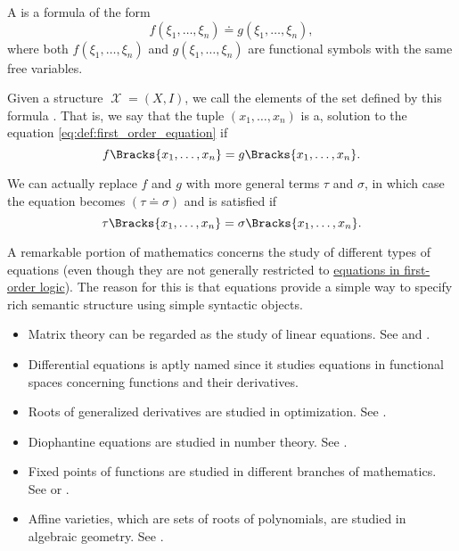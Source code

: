 \begin{definition}\label{def:first_order_equation}
  A  is a formula of the form
  \begin{equation}\label{eq:def:first_order_equation}
    f(\xi_1, \ldots, \xi_n) \doteq g(\xi_1, \ldots, \xi_n),
  \end{equation}
  where both \( f(\xi_1, \ldots, \xi_n) \) and \( g(\xi_1, \ldots, \xi_n) \) are functional symbols with the same free variables.

  Given a structure \( \mscrX = (X, I) \), we call the elements of the set defined by this formula . That is, we say that the tuple \( (x_1, \ldots, x_n) \) is a, solution to the equation \eqref{eq:def:first_order_equation} if
  \begin{equation*}
    f\Bracks{x_1, \ldots, x_n} = g\Bracks{x_1, \ldots, x_n}.
  \end{equation*}

  We can actually replace \( f \) and \( g \) with more general terms \( \tau \) and \( \sigma \), in which case the equation becomes \( (\tau \doteq \sigma) \) and is satisfied if
  \begin{equation*}
    \tau\Bracks{x_1, \ldots, x_n} = \sigma\Bracks{x_1, \ldots, x_n}.
  \end{equation*}
\end{definition}

\begin{example}\label{ex:equations}
  A remarkable portion of mathematics concerns the study of different types of equations (even though they are not generally restricted to \hyperref[def:first_order_equation]{equations in first-order logic}). The reason for this is that equations provide a simple way to specify rich semantic structure using simple syntactic objects.

  \begin{itemize}
    \item Matrix theory can be regarded as the study of linear equations. See  and .
    \item Differential equations is aptly named since it studies equations in functional spaces concerning functions and their derivatives.
    \item Roots of generalized derivatives are studied in optimization. See .
    \item Diophantine equations are studied in number theory. See .
    \item Fixed points of functions are studied in different branches of mathematics. See  or .
    \item Affine varieties, which are sets of roots of polynomials, are studied in algebraic geometry. See .
  \end{itemize}
\end{example}

